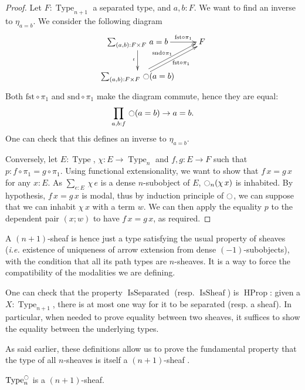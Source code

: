 \documentclass[notfinal]{jfrarticle}
\makeatletter
\def\dar[#1]#2{\ar@<-#2>[#1]\ar@<#2>[#1]} %
\DeclareMathOperator{\Type}{Type}
\DeclareMathOperator{\HProp}{HProp}
\newcommand{\modal}{\ensuremath{\ocircle}}
\newcommand{\sumD}[3]{\sum_{#1:#2}\, #3}
\newcommand{\prodD}[3]{\prod_{#1:#2}\, #3}
\newcommand{\code}[1]{\texttt{#1}}
\DeclareMathOperator{\issep}{IsSeparated}
\DeclareMathOperator{\issheaf}{IsSheaf}
\newcommand{\ie}{\emph{i.e.}}
\makeatother
\begin{document}
\begin{proof}
  Let $F:\Type_{n+1}$ a separated type, and $a,b:F$. We want to find
  an inverse to $\eta_{a=b}$. We consider the following diagram 
   \[ \xymatrix{
    \sumD {(a,b)} {F\times F} {a=b} \ar[r]^-{\text{fst} \circ \pi_1} \ar[d]_{\iota} & F \\
    \sumD {(a,b)} {F\times F} {\modal(a=b)}
    \dar[ru]{2pt}_{\quad\text{fst}\circ \pi_1} ^{\text{snd} \circ \pi_1} &
  }\]
  Both $\text{fst} \circ \pi_1$ and $\text{snd}\circ\pi_1$ make the
  diagram commute, hence they are equal:
  \[\prodD {a,b} f {\modal (a=b) \to a = b}.\]
  One can check that this defines an inverse to $\eta_{a=b}$.


  Conversely, let $E:\Type$, $\chi: E \to\Type_n$ and $f,g: E\to
  F$ such that $p:f\circ\pi_1 = g\circ \pi_1$.
  Using functional extensionality, we want to show that $f\, x=g\,x $
  for any $x:E$. As $\sumD e E {\chi\, e}$ is a dense $n$-subobject of $E$,
  $\modal_n (\chi\, x)$ is inhabited. By hypothesis, $f\, x = g\, x$
  is modal, thus by induction principle of $\modal$, we can suppose
  that we can inhabit $\chi\, x$ with a term $w$. We can then apply
  the equality $p$ to the dependent pair $(x;w)$ to have $f\, x =
  g\, x$, as required. 
\end{proof}

A $(n+1)$-sheaf is hence just a type satisfying the usual property of sheaves
(\ie{} existence of uniqueness of arrow extension from dense
$(-1)$-subobjects), with the condition that all its path types are
$n$-sheaves. It is a way to force the compatibility of the modalities we
are defining.

One can check that the property $\issep$ (resp. $\issheaf$) is $\HProp$:
given a $X:\Type_{n+1}$, there is at most one way for it to be separated
(resp. a sheaf). In particular, when needed to prove equality between
two sheaves, it suffices to show the equality between the underlying
types.

As said earlier, these definitions allow us to prove the fundamental
property that the type of all $n$-sheaves is itself a $(n+1)$-sheaf
.

\begin{prop}[\thethm\ (\code{nType\_j\_Type\_is\_SnType\_j\_Type})]
\label{prop:sheaf-is-sheaf}
  $\Type_n^\modal$ is a $(n+1)$-sheaf.
\end{prop}
\end{document}
